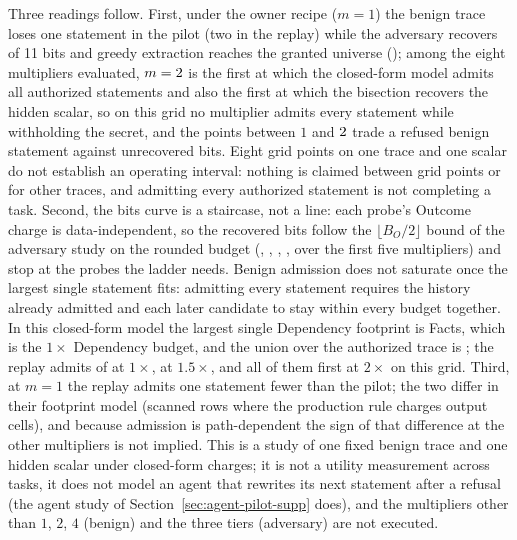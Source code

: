 \documentclass[journal,onecolumn]{IEEEtran}
\begin{document}
Three readings follow. First, under the owner recipe ($m=1$) the benign trace
loses one statement in the pilot (two in the replay) while the adversary
recovers \SweepBitsOne{} of 11 bits and greedy extraction reaches the granted
universe (\SweepGreedyOne{}); among the eight multipliers evaluated,
$m=2{}$ is the first at which the closed-form model admits all
\SweepBenignAuthorized{} authorized statements and also the first at which the
bisection recovers the hidden scalar, so on this grid no multiplier admits
every statement while withholding the secret, and the points
between $1$ and $2{}$ trade a refused benign statement against
unrecovered bits. Eight grid points on one trace and one scalar do not
establish an operating interval: nothing is claimed between grid points or
for other traces, and admitting every authorized statement is not completing
a task. Second, the bits curve is a staircase, not a line: each probe's
Outcome charge is data-independent, so the recovered bits follow the
$\lfloor B_O/2\rfloor$ bound of the adversary study on the rounded budget
(\SweepBitsQuarter{}, \SweepBitsHalf{}, \SweepBitsThreeQuarter{},
\SweepBitsOne{}, \SweepBitsOneHalf{} over the first five multipliers) and
stop at the \SweepBitsTwo{} probes the ladder needs. Benign admission does
not saturate once the largest single statement fits: admitting every
statement requires the history already admitted and each later candidate to
stay within every budget together. In this closed-form model the largest
single Dependency footprint is \SweepMaxStatementDependency{} Facts, which
is the $1\times$ Dependency budget, and the union over the authorized trace
is \SweepClosedFormUnion{}; the replay admits \SweepBenignOneAdmitted{} of
\SweepBenignAuthorized{} at $1\times$, \SweepBenignOneHalfAdmitted{} at
$1.5\times$, and all of them first at $2\times$ on this grid. Third, at $m=1$ the replay admits one
statement fewer than the pilot; the two differ in their footprint model
(scanned rows where the production rule charges output cells), and because
admission is path-dependent the sign of that difference at the other
multipliers is not implied. This is a study of one fixed benign trace and one hidden scalar
under closed-form charges; it is not a utility measurement across tasks, it
does not model an agent that rewrites its next statement after a refusal
(the agent study of Section~\ref{sec:agent-pilot-supp} does), and the multipliers
other than $1$, $2$, $4$ (benign) and the three tiers (adversary) are not
executed.
\end{document}
